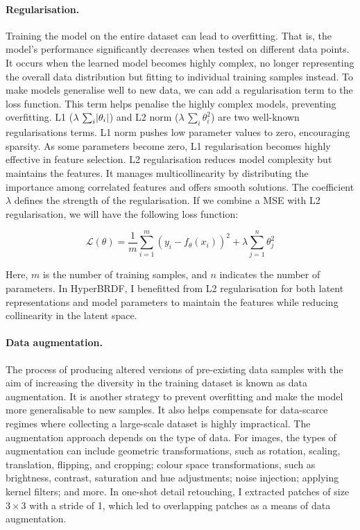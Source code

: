 \paragraph{Regularisation.} Training the model on the entire dataset can lead to overfitting. That is, the model's performance significantly decreases when tested on different data points. It occurs when the learned model becomes highly complex, no longer representing the overall data distribution but fitting to individual training samples instead. To make models generalise well to new data, we can add a regularisation term to the loss function. This term helps penalise the highly complex models, preventing overfitting. L1 ($\lambda \, \sum_i \lvert\theta_i\rvert$) and L2 norm ($\lambda \, \sum_i \theta^2_i$) are two well-known regularisations terms. L1 norm pushes low parameter values to zero, encouraging sparsity. As some parameters become zero, L1 regularisation becomes highly effective in feature selection. L2 regularisation reduces model complexity but maintains the features. It manages multicollinearity by distributing the importance among correlated features and offers smooth solutions. The coefficient $\lambda$ defines the strength of the regularisation. If we combine a \gls{MSE} with L2 regularisation, we will have the following loss function:

\begin{equation}
\mathcal{L}(\theta) = \frac{1}{m} \sum_{i=1}^{m} (y_i - f_\theta(x_i))^2 + \lambda \sum_{j=1}^{n} \theta_j^2
\label{MSE-with-L2reg}
\end{equation}

Here, $m$ is the number of training samples, and $n$ indicates the number of parameters. In HyperBRDF, I benefitted from L2 regularisation for both latent representations and model parameters to maintain the features while reducing collinearity in the latent space.

\paragraph{Data augmentation.} The process of producing altered versions of pre-existing data samples with the aim of increasing the diversity in the training dataset is known as data augmentation. It is another strategy to prevent overfitting and make the model more generalisable to new samples. It also helps compensate for data-scarce regimes where collecting a large-scale dataset is highly impractical. The augmentation approach depends on the type of data. For images, the types of augmentation can include geometric transformations, such as rotation, scaling, translation, flipping, and cropping; colour space transformations, such as brightness, contrast, saturation and hue adjustments; noise injection; applying kernel filters; and more. In one-shot detail retouching, I extracted patches of size $3 \times 3$ with a stride of 1, which led to overlapping patches as a means of data augmentation.

